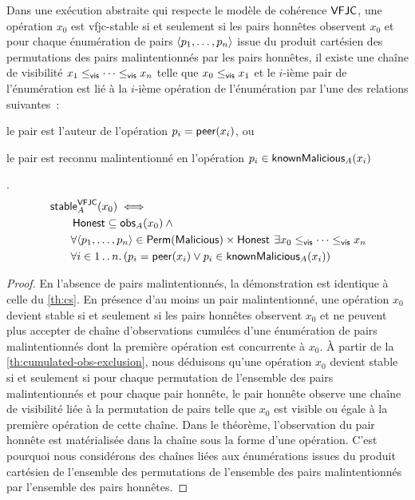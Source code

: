 \begin{theorem}\label{th:vfjc-stable}
Dans une exécution abstraite qui respecte le modèle de cohérence $\trm{VFJC}$, une opération $x_0$ est vfjc-stable si et seulement si les pairs honnêtes observent $x_0$ et pour chaque énumération de pairs $\tuple*{p_1, \dotsc, p_n}$ issue du produit cartésien des permutations des pairs malintentionnés par les pairs honnêtes, il existe une chaîne de visibilité $x_1 \viseq \dotsb \viseq x_n$ telle que $x_0 \viseq x_1$ et le $i$-ième pair de l'énumération est lié à la $i$-ième opération de l'énumération par l'une des relations suivantes~: \begin{inlinelist}
    \item le pair est l'auteur de l'opération $p_i = \trm{peer}(x_i)$, ou
    \item le pair est reconnu malintentionné en l'opération $p_i \in \trm{knownMalicious}_A(x_i)$
\end{inlinelist}.
\begin{equation*}\begin{split}
\MoveEqLeft\trm{stable}_A^{\trm{VFJC}}(x_0) \iff \\
    &\trm{Honest} \subseteq \trm{obs}_A(x_0) \:\land \\
    &\forall \tuple*{p_1,\dotsc, p_n} \in \trm{Perm}(\trm{Malicious}) \times \trm{Honest} \:\exists x_0 \viseq \dotsb \viseq x_n\\
    &\forall i \in \irange{1}{n} \qsep (p_i = \trm{peer}(x_i) \lor p_i \in \trm{knownMalicious}_A(x_i))
\end{split}\end{equation*}
\end{theorem}

\begin{proof}
En l'absence de pairs malintentionnés, la démonstration est identique à celle du \autoref{th:cs}.
%
En présence d'au moins un pair malintentionné, une opération $x_0$ devient stable si et seulement si les pairs honnêtes observent $x_0$ et ne peuvent plus accepter de chaîne d'observations cumulées d'une énumération de pairs malintentionnés dont la première opération est concurrente à $x_0$.
À partir de la \autoref{th:cumulated-obs-exclusion}, nous déduisons qu'une opération $x_0$ devient stable si et seulement si pour chaque permutation de l'ensemble des pairs malintentionnés et pour chaque pair honnête, le pair honnête observe une chaîne de visibilité liée à la permutation de pairs telle que $x_0$ est visible ou égale à la première opération de cette chaîne.
Dans le théorème, l'observation du pair honnête est matérialisée dans la chaîne sous la forme d'une opération.
C'est pourquoi nous considérons des chaînes liées aux énumérations issues du produit cartésien de l'ensemble des permutations de l'ensemble des pairs malintentionnés par l'ensemble des pairs honnêtes.
\end{proof}


